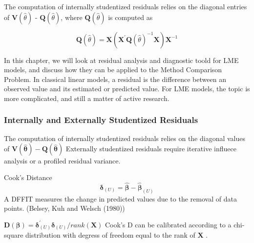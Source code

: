 \documentclass[12pt, a4paper]{report}
\theoremstyle{plain}
\theoremstyle{definition}
\theoremstyle{remark}
\begin{document}
	
	
	The computation of internally studentized residuals relies on the diagonal entries of $\boldsymbol{V} (\hat{\theta})$ - $\boldsymbol{Q} (\hat{\theta})$, where $\boldsymbol{Q} (\hat{\theta})$ is computed as
	
	\[ \boldsymbol{Q} (\hat{\theta}) = \boldsymbol{X} ( \boldsymbol{X}^{\prime}\boldsymbol{Q} (\hat{\theta})^{-1}\boldsymbol{X})\boldsymbol{X}^{-1} \]
	
	

	
	
	
	
	In this chapter, we will look at residual analysis and diagnostic toold for LME models, and discuss how they can be applied to the Method Comparison Problem.	In classical linear models, a residual is the difference between an observed value and its estimated or predicted value. For LME models, the topic is more complicated, and still a matter of active research. 
	
	
	\subsubsection{Internally and Externally Studentized Residuals}
	The computation of internally studentized residuals relies on the diagonal values of $\boldsymbol{V(\hat{\theta})} - \boldsymbol{Q(\hat{\theta})}$
	Externally studentized residuals require iterative influece analysis or a profiled residual variance.
	
	Cook's Distance
	\[ \boldsymbol{\delta}_{(U)} = \boldsymbol{\hat{\beta}}  - \boldsymbol{\hat{\beta}}_{(U)} \]
	A DFFIT measures the change in predicted values due to the removal of data points.
	(Belsey, Kuh and Welsch (1980))
	
	$\boldsymbol{D(\beta)}  = \boldsymbol{\delta}^{\prime}_{(U)} \boldsymbol{\delta}_{(U)} / rank(\boldsymbol{X})$
	Cook's D can be calibrated according to a chi-square distribution with degress of freedom equal to the rank of $\boldsymbol{X}$ \citep{Christensen}.
	
	
\end{document}
